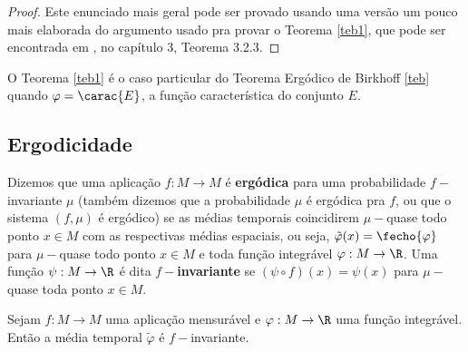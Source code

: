 \begin{proof} Este enunciado mais geral pode ser provado usando uma versão um pouco mais elaborada do argumento usado pra provar o Teorema \ref{teb1}, que pode ser encontrada em \cite{viana}, no capítulo 3, Teorema 3.2.3.
\end{proof}

O Teorema \ref{teb1} é o caso particular do Teorema Ergódico de Birkhoff \ref{teb} quando $\varphi=\carac{E}$, a função característica do conjunto $E$.

\subsection{Ergodicidade} 

Dizemos que uma aplicação $f:M\to M$ é \textbf{ergódica} para uma probabilidade $f-$invariante $\mu$ (também dizemos que a probabilidade $\mu$ é ergódica pra $f$, ou que o sistema $(f,\mu)$ é ergódico) se as médias temporais coincidirem $\mu-$quase todo ponto $x\in M$ com as respectivas médias espaciais, ou seja, $\tilde{\varphi}(x)=\fecho{\varphi}$ para $\mu-$quase todo ponto $x\in M$ e toda função integrável $\varphi:M\to\R$. Uma função $\psi:M\to\R$ é dita \textbf{$f-$invariante} se $(\psi\circ f)(x)=\psi(x)$ para $\mu-$quase toda ponto $x\in M$.

\begin{proposicao}\label{tempinv} Sejam $f:M\to M$ uma aplicação mensurável e $\varphi:M\to \R$ uma função integrável. Então a média temporal $\tilde{\varphi}$ é $f-$invariante.
\end{proposicao}

